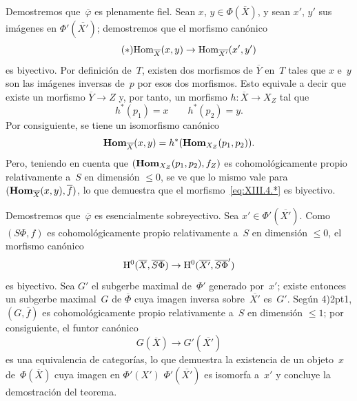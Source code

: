 Demostremos que~$\overline{\varphi}$ es plenamente fiel. Sean
$x$, $y \in \Phi(\overline{X})$, y sean $x'$, $y'$ sus imágenes en
$\Phi'(\overline{X'})$; demostremos que el morfismo canónico
\begin{equation*}
\label{eq:XIII.4.*} \tag{$*$} {\operatorname{Hom}_{\overline{X}}(x,y)
\to \operatorname{Hom}_{\overline{X'}}(x',y') }
\end{equation*}
es biyectivo. Por definición de~$T$, existen dos morfismos de
$\overline{Y}$ en~$T$ tales que $x$ e~$y$ son las imágenes inversas
de~$p$ por esos dos morfismos. Esto equivale a decir que existe un
morfismo $\overline{Y} \to Z$ y, por tanto, un morfismo
$h\colon \overline{X} \to X_Z$ tal que
$$
h^*(p_1)=x \qquad h^*(p_2)=y.
$$
Por consiguiente, se tiene un isomorfismo canónico
$$
\operatorname{\mathbf{Hom}}_{\overline{X}}(x,y)=h^*(\operatorname{\mathbf{Hom}}_{X_Z}(p_1,p_2) ).
$$
Pero, teniendo en cuenta que $(\operatorname{\mathbf{Hom}}_{X_Z}(p_1,p_2),f_Z)$ es
cohomológicamente propio relativamente a~$S$ en dimensión
$\leqslant 0$, se ve que lo mismo vale para
$(\operatorname{\mathbf{Hom}}_{\overline{X}}(x,y),\overline{f})$, lo que demuestra que
el morfismo~\eqref{eq:XIII.4.*} es biyectivo.

Demostremos que~$\overline{\varphi}$ es esencialmente sobreyectivo. Sea
$x'\in \Phi'(\overline{X'})$. Como $(S\Phi,f)$ es cohomológicamente
propio relativamente a~$S$ en dimensión $\leqslant 0$, el morfismo
canónico
$$
\mathrm H^0(\overline{X},\overline{S\Phi}) \to
\mathrm H^0(\overline{X'},\overline{S\Phi}')
$$
es biyectivo. Sea $G'$ el subgerbe maximal de~$\Phi'$ generado
por~$x'$; existe entonces un subgerbe maximal~$G$ de
$\overline{\Phi}$ cuya imagen inversa sobre~$\overline{X'}$ es~$G'$.
Según 4)\kern2pt1, $(G,\overline{f})$ es cohomológicamente propio
relativamente a~$S$ en dimensión $\leqslant 1$; por consiguiente, el
funtor canónico
$$
G(\overline{X}) \to G'(\overline{X'})
$$
%
es una equivalencia de categorías, lo que demuestra la existencia
de un objeto~$x$ de~$\Phi(\overline{X})$ cuya imagen en
{$\Phi'(X')$}
{$\Phi'(\overline{X'})$}
es isomorfa a~$x'$ y concluye la demostración del teorema.
